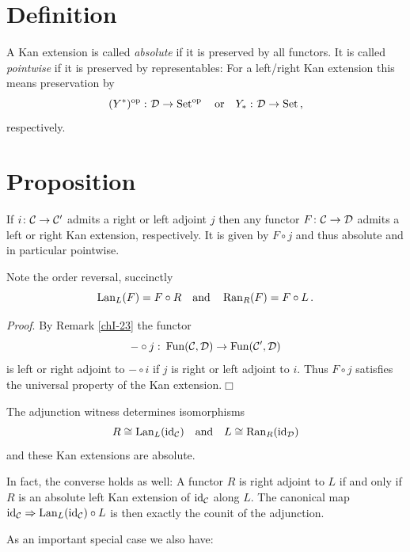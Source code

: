     \section{Definition}
        A Kan extension is called \emph{absolute} if it is preserved by all functors. It is called \emph{pointwise} if it is preserved by representables: For a left/right Kan extension this means preservation by
        \begin{equation*}
            (Y^*)^{\operatorname{op}} \,\colon \mathcal{D} \to \operatorname{Set}^{\operatorname{op}} \quad \text{or} \quad Y_* \,\colon \mathcal{D} \to \operatorname{Set} \,,
        \end{equation*}
        respectively.
    \section{Proposition}\label{chI-32}
        If $i \colon \mathcal{C} \to \mathcal{C}'$ admits a right or left adjoint $j$ then any functor $F \colon \mathcal{C} \to \mathcal{D}$ admits a left or right Kan extension, respectively. It is given by $F \circ j$ and thus absolute and in particular pointwise.

        Note the order reversal, succinctly
        \begin{equation*}
            \operatorname{Lan}_L(F) = F \circ R \quad \text{and} \quad \operatorname{Ran}_R(F) = F \circ L \,.
        \end{equation*}

        \emph{Proof}. By Remark \ref{chI-23} the functor
        \begin{equation*}
            - \circ j \,\colon \operatorname{Fun}(\mathcal{C}, \mathcal{D}) \to \operatorname{Fun}(\mathcal{C}', \mathcal{D})
        \end{equation*}
        is left or right adjoint to $- \circ i$ if $j$ is right or left adjoint to $i$. Thus $F \circ j$ satisfies the universal property of the Kan extension.\hfill\(\Box\)

        The adjunction witness determines isomorphisms
        \begin{equation*}
            R \cong \operatorname{Lan}_L(\operatorname{id}_{\mathcal{C}}) \quad \text{and} \quad L \cong \operatorname{Ran}_R(\operatorname{id}_{\mathcal{D}})
        \end{equation*}
        and these Kan extensions are absolute.

        In fact, the converse holds as well: A functor $R$ is right adjoint to $L$ if and only if $R$ is an absolute left Kan extension of $\operatorname{id}_{\mathcal{C}}$ along $L$. The canonical map $\operatorname{id}_{\mathcal{C}} \Rightarrow \operatorname{Lan}_L(\operatorname{id}_{\mathcal{C}}) \circ L$ is then exactly the counit of the adjunction.
        \medskip

        As an important special case we also have:
